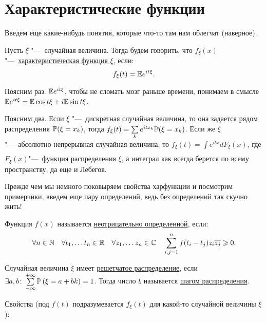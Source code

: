 \documentclass[../TV&MS.tex]{subfiles}
\begin{document}
\section{Характеристические функции}

Введем еще какие-нибудь понятия, которые что-то там нам облегчат (наверное).

\begin{Def}
    Пусть $\xi$ "---~случайная величина. Тогда будем говорить, что $f_\xi \left( x \right) $ "---~\uline{характеристическая функция $\xi$}, если:
    \[
        f_\xi(t) = \mathbb{E} e^{it\xi}
    .\] 
\end{Def} 

Поясним раз.  $\mathbb{E} e^{it\xi}$, чтобы не сломать мозг раньше времени, понимаем в смысле
$\mathbb{E} e^{it\xi} = \mathbb{E} \cos{t\xi} + i\mathbb{E} \sin{t\xi}$.

Поясним два. Если $\xi$ "---~дискретная случайная величина, то она задается рядом
распределения $\mathbb{P}(\xi = x_k)$, тогда  $f_\xi(t) = \sum\limits_{k}^{} e^{itx_k} \mathbb{P}(\xi = x_k)$. Если же $\xi$"---~абсолютно непрерывная случайная величина, 
то  $f_\xi(t) = \int\limits_{}^{} e^{itx} dF_\xi(x)$, где $F_\xi(x)$"---~функция распределения $\xi$, а интеграл как всегда берется по всему пространству, да еще и Лебегов.

Прежде чем мы немного поковыряем свойства харфункции и посмотрим примерчики,
введем еще пару определений, ведь без определений так скучно жить!

\begin{Def}
    Функция $f(x)$ называется \uline{неотрицательно определенной}, если:
    \[
    \forall n \in \mathbb{N} \quad \forall t_1, \ldots t_n \in \mathbb{R} \quad
    \forall z_1, \ldots z_n \in \mathbb{C} \quad 
    \sum\limits_{i,j=1}^{n} f(t_i - t_j) z_i \overline{z_j} \geqslant 0
    .\] 
\end{Def} 

\begin{Def}
    Случайная величина $\xi$ имеет \uline{решетчатое распределение}, если
    $\exists a, b \colon \sum\limits_{-\infty}^{+\infty}
    \mathbb{P}\left(\xi = a + bk\right)= 1$. Тогда число $b$ называется 
    \uline{шагом распределения}.
\end{Def} 

Свойства (под $f(t)$ подразумевается $f_\xi(t)$ для какой-то случайной величины $\xi$):
\end{document}
